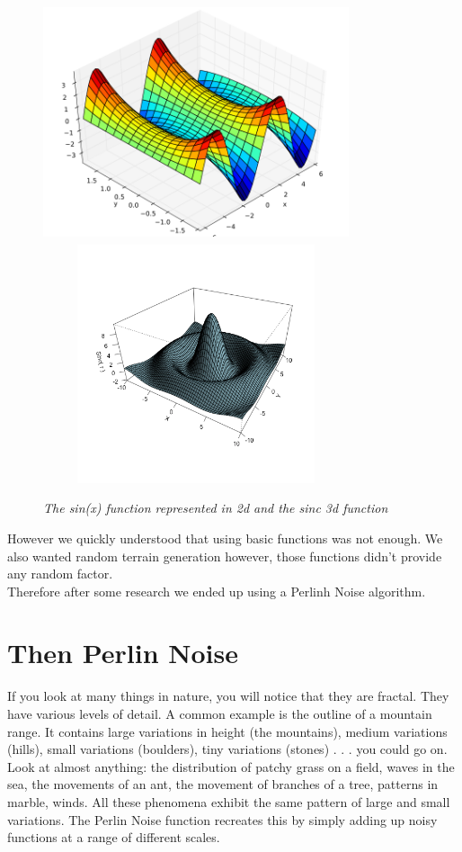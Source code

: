 \documentclass[article]{report}         %
\begin{document}
            \begin{figure}[h]
              \includegraphics[width=9cm, height=7cm]{images/Terrain/3.png}
              \includegraphics[width=9cm, height=7cm]{images/Terrain/4.png}
              \begin{center}\it The sin(x) function represented in 2d and the sinc 3d function\end{center}
            \end{figure}

            However we quickly understood that using basic functions was not enough. We also wanted random terrain generation however, those functions didn't provide any random factor.\\
            Therefore after some research we ended up using a Perlinh Noise algorithm.
 
      \section{Then Perlin Noise}
        If you look at many things in nature, you will notice that they are fractal. They have various levels of detail. A common example is the outline of a mountain range. It contains large variations in height (the mountains), medium variations (hills), small variations (boulders), tiny variations (stones) . . . you could go on.\\
        Look at almost anything: the distribution of patchy grass on a field, waves in the sea, the movements of an ant, the movement of branches of a tree, patterns in marble, winds. All these phenomena exhibit the same pattern of large and small variations. The Perlin Noise function recreates this by simply adding up noisy functions at a range of different scales.\\
\end{document}

